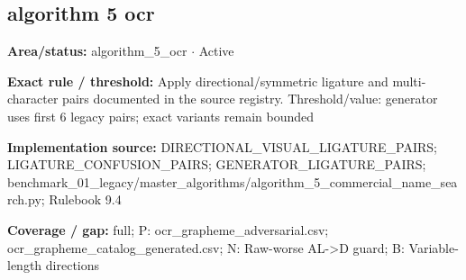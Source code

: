 \subsection*{algorithm 5 ocr}
\begin{tcolorbox}[enhanced,breakable,colback=white,colframe=Muted!45,boxrule=0.45pt,arc=1.5pt,left=6pt,right=6pt,top=5pt,bottom=5pt,title={\texttt{A5-LIGATURES-12}},title after break={\texttt{A5-LIGATURES-12}\ (continued)},fonttitle=\headingfont\bfseries\color{Navy},coltitle=Navy]
\textbf{Area/status:} algorithm\_\allowbreak{}5\_\allowbreak{}ocr $\boldsymbol{\cdot}$ Active\par
\smallskip
\textbf{Exact rule / threshold:} Apply directional/\allowbreak{}symmetric ligature and multi-character pairs documented in the source registry. Threshold/\allowbreak{}value: generator uses first 6 legacy pairs; exact variants remain bounded\par
\smallskip
\textbf{Implementation source:} DIRECTIONAL\_\allowbreak{}VISUAL\_\allowbreak{}LIGATURE\_\allowbreak{}PAIRS; LIGATURE\_\allowbreak{}CONFUSION\_\allowbreak{}PAIRS; GENERATOR\_\allowbreak{}LIGATURE\_\allowbreak{}PAIRS; benchmark\_\allowbreak{}01\_\allowbreak{}legacy/\allowbreak{}master\_\allowbreak{}algorithms/\allowbreak{}algorithm\_\allowbreak{}5\_\allowbreak{}commercial\_\allowbreak{}name\_\allowbreak{}search.py; Rulebook 9.4\par
\smallskip
\textbf{Coverage / gap:} full; P: ocr\_\allowbreak{}grapheme\_\allowbreak{}adversarial.csv; ocr\_\allowbreak{}grapheme\_\allowbreak{}catalog\_\allowbreak{}generated.csv; N: Raw-worse AL->D guard; B: Variable-length directions
\end{tcolorbox}
\medskip
